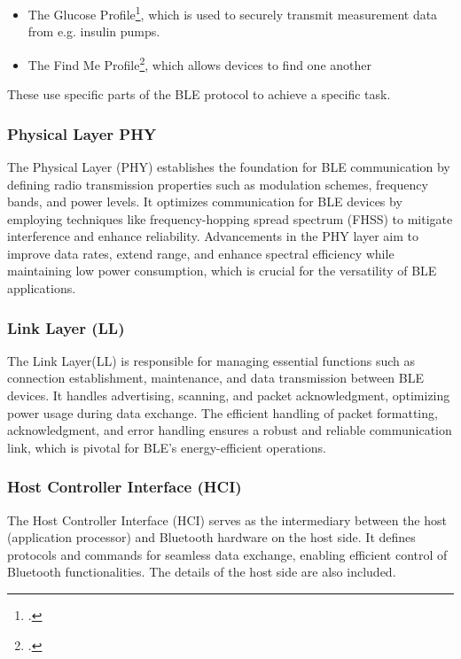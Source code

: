 \begin{itemize}
	\item The Glucose Profile\footcite{glucose-profile}, which is used to securely transmit measurement data from e.g. insulin pumps. 
	\item The Find Me Profile\footcite{find-me-profile}, which allows devices to find one another
\end{itemize}

These use specific parts of the BLE protocol to achieve a specific task.

\subsubsection{Physical Layer PHY}
The Physical Layer (PHY) establishes the foundation for BLE communication by defining radio transmission properties such as modulation schemes, frequency bands, and power levels. It optimizes communication for BLE devices by employing techniques like frequency-hopping spread spectrum (FHSS) to mitigate interference and enhance reliability. Advancements in the PHY layer aim to improve data rates, extend range, and enhance spectral efficiency while maintaining low power consumption, which is crucial for the versatility of BLE applications.

\subsubsection{Link Layer (LL)}
The Link Layer(LL)
is responsible for managing essential functions such as connection establishment, maintenance, and data transmission between BLE devices. It handles advertising, scanning, and packet acknowledgment, optimizing power usage during data exchange. The efficient handling of packet formatting, acknowledgment, and error handling ensures a robust and reliable communication link, which is pivotal for BLE's energy-efficient operations.

\subsubsection{Host Controller Interface (HCI)}
The Host Controller Interface (HCI)
serves as the intermediary between the host (application processor) and Bluetooth hardware on the host side. It defines protocols and commands for seamless data exchange, enabling efficient control of Bluetooth functionalities.
The details of the host side are also included.

